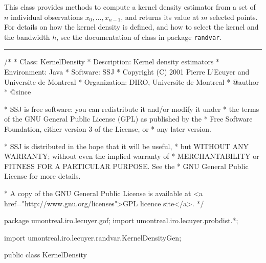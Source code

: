 
This class provides methods to compute a kernel density estimator from a set
of $n$ individual observations $x_0, \ldots, x_{n-1}$, and returns its value
at $m$ selected points. For details on how the kernel density is defined,
and how to select the kernel and the bandwidth $h$,
see the documentation of class 
in package \texttt{randvar}.

\bigskip\hrule

\begin{code}
\begin{hide}
/*
 * Class:        KernelDensity
 * Description:  Kernel density estimators
 * Environment:  Java
 * Software:     SSJ 
 * Copyright (C) 2001  Pierre L'Ecuyer and Universite de Montreal
 * Organization: DIRO, Universite de Montreal
 * @author       
 * @since

 * SSJ is free software: you can redistribute it and/or modify it under
 * the terms of the GNU General Public License (GPL) as published by the
 * Free Software Foundation, either version 3 of the License, or
 * any later version.

 * SSJ is distributed in the hope that it will be useful,
 * but WITHOUT ANY WARRANTY; without even the implied warranty of
 * MERCHANTABILITY or FITNESS FOR A PARTICULAR PURPOSE.  See the
 * GNU General Public License for more details.

 * A copy of the GNU General Public License is available at
   <a href="http://www.gnu.org/licenses">GPL licence site</a>.
 */
\end{hide}
package umontreal.iro.lecuyer.gof;
   import umontreal.iro.lecuyer.probdist.*;
\begin{hide}
import umontreal.iro.lecuyer.randvar.KernelDensityGen;
\end{hide}

public class KernelDensity \begin{hide} {

   private static double estimate (EmpiricalDist dist,
                                   ContinuousDistribution kern,
                                   double h, double y) {
      // Computes and returns the kernel density estimate at $y$, where the 
      // kernel is the density kern.density(x), and the bandwidth is $h$.
      double z;
      double a = kern.getXinf();       // lower limit of density
      double b = kern.getXsup();       // upper limit of density
      double sum = 0;
      int n = dist.getN();
      for (int i = 0; i < n; i++) {
         z = (y - dist.getObs(i))/h;
         if ((z >= a) && (z <= b))
            sum += kern.density(z);
      }

      sum /= (h*n);
      return sum;
   }\end{hide}
\end{code}


